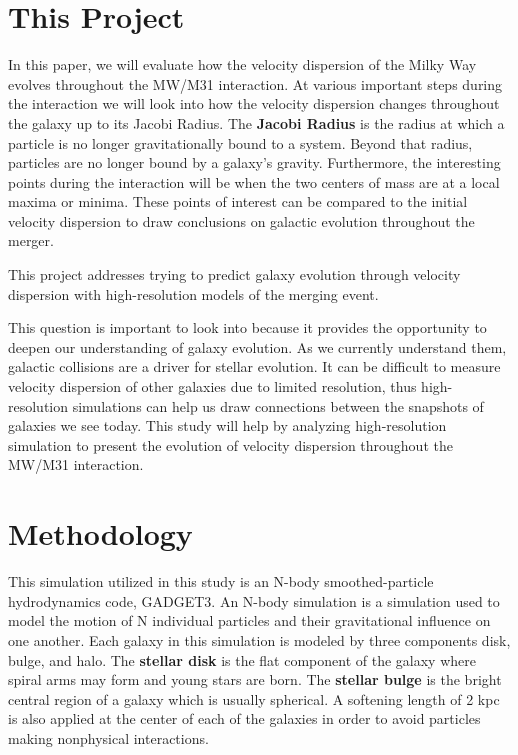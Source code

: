 \documentclass[fleqn,usenatbib]{mnras}
\begin{document}
\section{This Project}

In this paper, we will evaluate how the velocity dispersion of the Milky Way evolves throughout the MW/M31 interaction. At various important steps during the interaction we will look into how the velocity dispersion changes throughout the galaxy up to its Jacobi Radius. The \textbf{Jacobi Radius} is the radius at which a particle is no longer gravitationally bound to a system. Beyond that radius, particles are no longer bound by a galaxy's gravity. Furthermore, the interesting points during the interaction will be when the two centers of mass are at a local maxima or minima. These points of interest can be compared to the initial velocity dispersion to draw conclusions on galactic evolution throughout the merger.

This project addresses trying to predict galaxy evolution through velocity dispersion with high-resolution models of the merging event.

This question is important to look into because it provides the opportunity to deepen our understanding of galaxy evolution. As we currently understand them, galactic collisions are a driver for stellar evolution. \cite{Schawinski_2010} It can be difficult to measure velocity dispersion of other galaxies due to limited resolution, thus high-resolution simulations can help us draw connections between the snapshots of galaxies we see today. This study will help by analyzing high-resolution simulation to present the evolution of velocity dispersion throughout the MW/M31 interaction.


\section{Methodology}

This simulation utilized in this study is an N-body smoothed-particle hydrodynamics code, GADGET3. \cite{10.1111/j.1365-2966.2005.09655.x} An N-body simulation is a simulation used to model the motion of N individual particles and their gravitational influence on one another. Each galaxy in this simulation is modeled by three components disk, bulge, and halo. The \textbf{stellar disk} is the flat component of the galaxy where spiral arms may form and young stars are born. The \textbf{stellar bulge} is the bright central region of a galaxy which is usually spherical. A softening length of 2 kpc is also applied at the center of each of the galaxies in order to avoid particles making nonphysical interactions. \cite{vanderMarel_2012}
\end{document}
